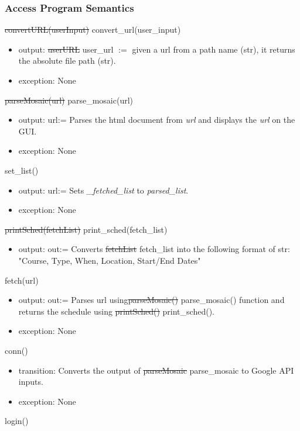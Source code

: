 \documentclass[12pt, titlepage]{article}
\begin{document}
\subsubsection{Access Program Semantics}
\sout{convertURL(userInput)} \color{blue}convert\_url(user\_input)\color{black} 
\begin{itemize}
    \item output: \sout{userURL} \color{blue}user\_url\color{black}  $:=$ given a url from a path name (str), it returns the absolute file path (str).
    \item exception: None
\end{itemize}
\sout{parseMosaic(url)} \color{blue}parse\_mosaic(url)\color{black}
\begin{itemize}
    \item output: url:= Parses the html document from \emph{url} and displays the \emph{url} on the GUI.
    \item exception: None
\end{itemize}
\color{blue}set\_list()\color{black}
\begin{itemize}
    \color{blue}\item output: url:= Sets \emph{\_fetched\_list} to \emph{parsed\_list}.\color{black}
    \color{blue}\item exception: None\color{black}
\end{itemize}
\sout{printSched(fetchList)} \color{blue}print\_sched(fetch\_list)\color{black}
\begin{itemize}
    \item output: out:= Converts \sout{fetchList} \color{blue}fetch\_list \color{black} into the following format of str: "Course, Type, When, Location, Start/End Dates"
\end{itemize}
fetch(url)
\begin{itemize}
    \item output: out:= Parses url using\sout{parseMosaic()} \color{blue}parse\_mosaic() \color{black} function and returns the schedule using \sout{printSched()} \color{blue}print\_sched()\color{black}.
    \item exception: None
\end{itemize}
conn()
\begin{itemize}
    \item transition: Converts the output of \sout{parseMosaic} \color{blue}parse\_mosaic \color{black} to Google API inputs.
    \item exception: None
\end{itemize}
login()
\end{document}
